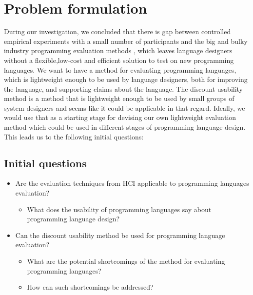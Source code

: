 \section{Problem formulation}
During our investigation, we concluded that there is gap between  controlled empirical experiments with a small number of participants and the big and bulky industry programming evaluation methods , which leaves language designers without a flexible,low-cost and efficient solution to test on new programming languages. We want to have a method for evaluating programming languages, which is lightweight enough to be used by language designers, both for improving the language, and supporting claims about the language. The discount usability method is a method that is lightweight enough to be used by small groups of system designers and seems like it could be applicable in that regard. Ideally, we would use that as a starting stage for devising our own lightweight evaluation method which could be used in different stages of programming language design. This leads us to the following initial questions:

\subsection{Initial questions}
\begin{itemize}
\item Are the evaluation techniques from HCI applicable to programming languages evaluation?
	\begin{itemize}
		\item What does the usability of programming languages say about programming language design?
	\end{itemize}
\item Can the discount usability method be used for programming language evaluation?
	\begin{itemize}
		\item What are the potential shortcomings of the method for evaluating programming languages?
		\item How can such shortcomings be addressed?
	\end{itemize}
\end{itemize}
